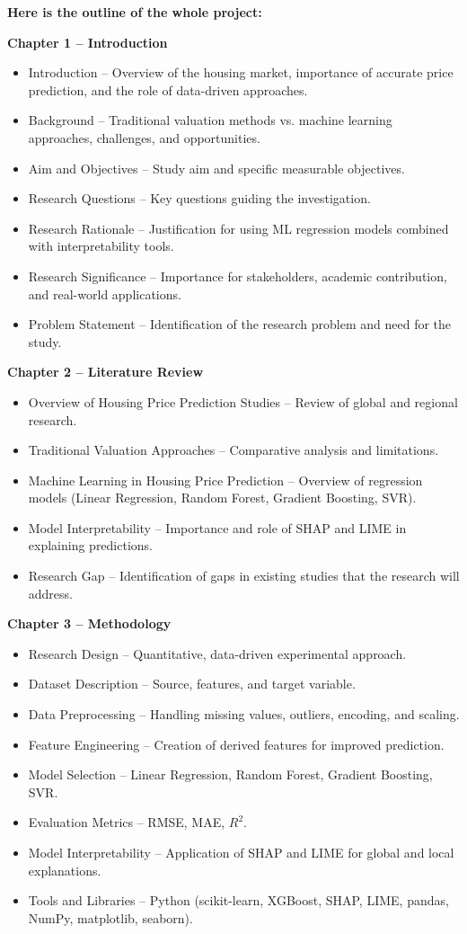 \documentclass[12pt, a4paper, oneside]{book}
\begin{document}
\textbf{}

\textbf{Here is the outline of the whole project:}

\textbf{Chapter 1 -- Introduction}
\begin{itemize}
\item Introduction -- Overview of the housing market, importance of accurate price prediction, and the role of data-driven approaches.
\item Background -- Traditional valuation methods vs. machine learning approaches, challenges, and opportunities.
\item Aim and Objectives -- Study aim and specific measurable objectives.
\item Research Questions -- Key questions guiding the investigation.
\item Research Rationale -- Justification for using ML regression models combined with interpretability tools.
\item Research Significance -- Importance for stakeholders, academic contribution, and real-world applications.
\item Problem Statement -- Identification of the research problem and need for the study.
\end{itemize}

\textbf{Chapter 2 -- Literature Review}
\begin{itemize}
\item Overview of Housing Price Prediction Studies -- Review of global and regional research.
\item Traditional Valuation Approaches -- Comparative analysis and limitations.
\item Machine Learning in Housing Price Prediction -- Overview of regression models (Linear Regression, Random Forest, Gradient Boosting, SVR).
\item Model Interpretability -- Importance and role of SHAP and LIME in explaining predictions.
\item Research Gap -- Identification of gaps in existing studies that the research will address.
\end{itemize}

\textbf{Chapter 3 -- Methodology}
\begin{itemize}
\item Research Design -- Quantitative, data-driven experimental approach.
\item Dataset Description -- Source, features, and target variable.
\item Data Preprocessing -- Handling missing values, outliers, encoding, and scaling.
\item Feature Engineering -- Creation of derived features for improved prediction.
\item Model Selection -- Linear Regression, Random Forest, Gradient Boosting, SVR.
\item Evaluation Metrics -- RMSE, MAE, $R^2$.
\item Model Interpretability -- Application of SHAP and LIME for global and local explanations.
\item Tools and Libraries -- Python (scikit-learn, XGBoost, SHAP, LIME, pandas, NumPy, matplotlib, seaborn).
\end{itemize}
\end{document}
